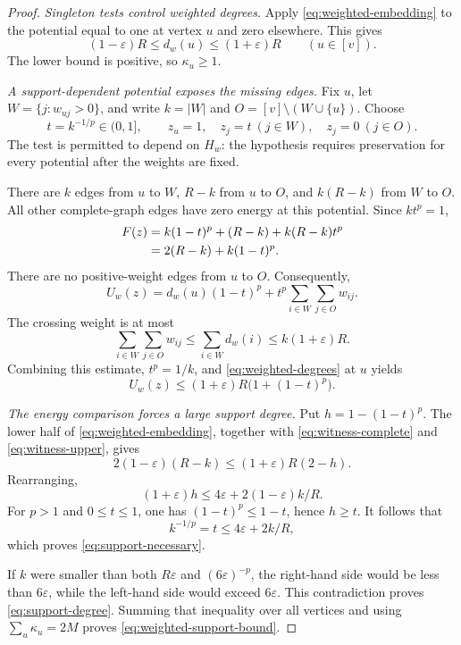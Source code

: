 \documentclass[11pt]{article}
\theoremstyle{spaced}
\numberwithin{equation}{section}
\begin{document}
\begin{proof}
\emph{Singleton tests control weighted degrees.}
Apply \eqref{eq:weighted-embedding} to the potential equal to one at
vertex $u$ and zero elsewhere. This gives
\begin{equation}\label{eq:weighted-degrees}
 (1-\varepsilon)R\le d_w(u)\le(1+\varepsilon)R
 \qquad(u\in[v]).
\end{equation}
The lower bound is positive, so $\kappa_u\ge1$.

\emph{A support-dependent potential exposes the missing edges.}
Fix $u$, let $W=\{j:w_{uj}>0\}$, and write $k=|W|$ and
$O=[v]\setminus(W\cup\{u\})$. Choose
\[
 t=k^{-1/p}\in(0,1],
 \qquad
 z_u=1,\quad z_j=t\ (j\in W),\quad z_j=0\ (j\in O).
\]
The test is permitted to depend on $H_w$: the hypothesis requires
preservation for every potential after the weights are fixed.

There are $k$ edges from $u$ to $W$, $R-k$ from $u$ to $O$, and
$k(R-k)$ from $W$ to $O$. All other complete-graph edges have zero
energy at this potential. Since $kt^p=1$,
\begin{align}
 F(z)
 &=k(1-t)^p+(R-k)+k(R-k)t^p \notag\\
 &=2(R-k)+k(1-t)^p.
 \label{eq:witness-complete}
\end{align}
There are no positive-weight edges from $u$ to $O$. Consequently,
\begin{equation}\label{eq:witness-weighted}
 U_w(z)=d_w(u)(1-t)^p+
       t^p\sum_{i\in W}\sum_{j\in O}w_{ij}.
\end{equation}
The crossing weight is at most
\[
 \sum_{i\in W}\sum_{j\in O}w_{ij}
 \le\sum_{i\in W}d_w(i)
 \le k(1+\varepsilon)R.
\]
Combining this estimate, $t^p=1/k$, and
\eqref{eq:weighted-degrees} at $u$ yields
\begin{equation}\label{eq:witness-upper}
 U_w(z)\le(1+\varepsilon)R\bigl(1+(1-t)^p\bigr).
\end{equation}

\emph{The energy comparison forces a large support degree.}
Put $h=1-(1-t)^p$. The lower half of
\eqref{eq:weighted-embedding}, together with
\eqref{eq:witness-complete} and \eqref{eq:witness-upper}, gives
\[
 2(1-\varepsilon)(R-k)
 \le(1+\varepsilon)R(2-h).
\]
Rearranging,
\begin{equation}\label{eq:nonlinear-necessary}
 (1+\varepsilon)h
 \le4\varepsilon+2(1-\varepsilon)k/R.
\end{equation}
For $p>1$ and $0\le t\le1$, one has $(1-t)^p\le1-t$, hence
$h\ge t$. It follows that
\[
 k^{-1/p}=t\le4\varepsilon+2k/R,
\]
which proves \eqref{eq:support-necessary}.

If $k$ were smaller than both $R\varepsilon$ and
$(6\varepsilon)^{-p}$, the right-hand side would be less than
$6\varepsilon$, while the left-hand side would exceed
$6\varepsilon$. This contradiction proves
\eqref{eq:support-degree}. Summing that inequality over all vertices
and using $\sum_u\kappa_u=2M$ proves
\eqref{eq:weighted-support-bound}.
\end{proof}
\end{document}
